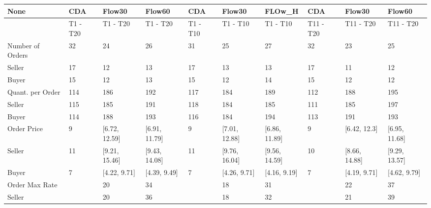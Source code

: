 \begin{tabular}{llllllllll}
\hline
 None                   & CDA      & Flow30         & Flow60         & CDA      & Flow30         & FLOw\_H        & CDA       & Flow30         & Flow60         \\
\hline
                        & T1 - T20 & T1 - T20      & T1 - T20      & T1 - T10 & T1 - T10      & T1 - T10      & T11 - T20 & T11 - T20     & T11 - T20     \\
 Number of Orders       & 32       & 24            & 26            & 31       & 25            & 27            & 32        & 23            & 25            \\
 Seller                 & 17       & 12            & 13            & 17       & 13            & 13            & 17        & 11            & 12            \\
 Buyer                  & 15       & 12            & 13            & 15       & 12            & 14            & 15        & 12            & 12            \\
 Quant. per Order       & 114      & 186           & 192           & 117      & 184           & 189           & 112       & 188           & 195           \\
 Seller                 & 115      & 185           & 191           & 118      & 184           & 185           & 111       & 185           & 197           \\
 Buyer                  & 114      & 188           & 193           & 116      & 184           & 194           & 113       & 191           & 193           \\
 Order Price            & 9        & [6.72, 12.59] & [6.91, 11.79] & 9        & [7.01, 12.88] & [6.86, 11.89] & 9         & [6.42, 12.3]  & [6.95, 11.68] \\
 Seller                 & 11       & [9.21, 15.46] & [9.43, 14.08] & 11       & [9.76, 16.04] & [9.56, 14.59] & 10        & [8.66, 14.88] & [9.29, 13.57] \\
 Buyer                  & 7        & [4.22, 9.71]  & [4.39, 9.49]  & 7        & [4.26, 9.71]  & [4.16, 9.19]  & 7         & [4.19, 9.71]  & [4.62, 9.79]  \\
 Order Max Rate         &          & 20            & 34            &          & 18            & 31            &           & 22            & 37            \\
 Seller                 &          & 20            & 36            &          & 18            & 32            &           & 21            & 39            \\

\end{tabular}
